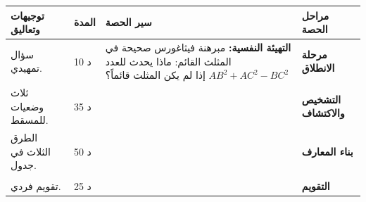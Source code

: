 \documentclass[12pt,a4paper]{article}
\newenvironment{LTR}{\begin{otherlanguage}{english}}{\end{otherlanguage}}
\newcommand{\ar}[1]{\foreignlanguage{arabic}{#1}}
\newcommand{\Phase}[1]{\textbf{#1}}
\newenvironment{Sayr}{%
\begin{LTR}\renewcommand{\arraystretch}{1.25}
\begin{longtable}{|p{0.17\textwidth}|>{\centering\arraybackslash}p{0.06\textwidth}|p{0.53\textwidth}|>{\centering\arraybackslash}p{0.12\textwidth}|}
\hline\rowcolor{cThm!12}\ar{\textbf{توجيهات وتعاليق}} & \ar{\textbf{المدة}} & \ar{\textbf{سير الحصة}} & \ar{\textbf{مراحل الحصة}}\\\hline\endhead
\hline\endfoot}{\end{longtable}\end{LTR}}
\newcommand{\Row}[4]{\ar{\small #4} & \ar{#3} & \ar{#2} & \cellcolor{cThm!8}\ar{\Phase{#1}}\\\hline}
\newcommand{\Lab}[2]{\foreignlanguage{english}{\tcbox[on line,colback=#1,colframe=#1,boxrule=0pt,arc=2pt,boxsep=1pt,left=5pt,right=5pt,top=1pt,bottom=1pt]{\ar{\textcolor{white}{\textbf{#2}}}}}}
\newcommand{\ck}{\ensuremath{{\color{cRem}\checkmark}}}
\begin{document}
\begin{Sayr}
\Row{مرحلة الانطلاق}{%
\textbf{التهيئة النفسية:} مبرهنة فيثاغورس صحيحة في المثلث القائم: ماذا يحدث للعدد $AB^2+AC^2-BC^2$ إذا لم يكن المثلث قائماً؟}{10 د}{سؤال تمهيدي.}
\Row{التشخيص والاكتشاف}{%
\Lab{cEx}{مناقشة نشاط 01 (أنشطة باب الجداء السلمي)}\par\ck\ $H$ المسقط العمودي لـ $C$ على $(AB)$: ثلاث وضعيات للنقطة $H$.\par
\ck\ نجد أن $\frac12(AB^2+AC^2-BC^2)$ يساوي $AB\times AH$ بإشارة حسب الوضعية: هذا العدد هو \textbf{الجداء السلمي} $\overrightarrow{AB}\cdot\overrightarrow{AC}$.\par
}{35 د}{ثلاث وضعيات للمسقط.}
\Row{بناء المعارف}{%
\Lab{cDef}{تعريف}\ $\vec u\cdot\vec v=\|\vec u\|\,\|\vec v\|\cos(\vec u;\vec v)$ (ويساوي $0$ إذا كان أحدهما معدوماً).\par\Lab{cThm}{طرق الحساب}\par\ck\ \textbf{بالإسقاط}: $\overrightarrow{AB}\cdot\overrightarrow{AC}=\overrightarrow{AB}\cdot\overrightarrow{AH}$ ($H$ مسقط $C$ على $(AB)$).\par
\ck\ \textbf{بالنظيمين}: $\vec u\cdot\vec v=\frac12\left(\|\vec u+\vec v\|^2-\|\vec u\|^2-\|\vec v\|^2\right)$.\par
\ck\ \textbf{بالمركبات} (معلم متعامد ومتجانس): $\vec u(x;y)$ ، $\vec v(x^{\prime};y^{\prime})$: $\vec u\cdot\vec v=xx^{\prime}+yy^{\prime}$.\par
\par\smallskip\begin{LTR}\centering \begin{tikzpicture}[scale=0.9,font=\scriptsize]
\coordinate (A) at (0,0); \coordinate (B) at (4,0); \coordinate (C) at (2.6,2); \coordinate (H) at (2.6,0);
\draw[thick,->,cDef] (A)--(B); \draw[thick,->,cThm] (A)--(C); \draw[dashed] (C)--(H);
\draw (2.6,0.25)--(2.35,0.25)--(2.35,0);
\fill (A) circle (1.4pt) node[below left]{$A$}; \fill (B) circle (1.4pt) node[below]{$B$};
\fill (C) circle (1.4pt) node[above]{$C$}; \fill (H) circle (1.4pt) node[below]{$H$};
\end{tikzpicture}\end{LTR}\par }{50 د}{الطرق الثلاث في جدول.}
\Row{}{%
\Lab{cEx}{مثال}\ $AB=4$ ، $AC=3$ ، $\widehat{BAC}=\frac\pi3$: $\overrightarrow{AB}\cdot\overrightarrow{AC}=4\times3\times\frac12=6$ ؛ $\vec u(2;-1)$ ، $\vec v(3;4)$: $\vec u\cdot\vec v=6-4=2$.\par\Lab{cThm!80!black}{حذار}\ الجداء السلمي \textbf{عدد} وليس شعاعاً.}{}{}
\Row{التقويم}{%
\Lab{cEx}{تطبيق}\par $ABC$ متقايس الأضلاع طول ضلعه $2$: احسب $\overrightarrow{AB}\cdot\overrightarrow{AC}$. ثم احسب $\vec u\cdot\vec v$ حيث $\vec u(1;2)$ و $\vec v(-4;2)$.\par\textbf{الحل:} $2\times2\times\cos\frac\pi3=2$ ؛ $-4+4=0$.\par\textbf{واجب منزلي:} تمارين 27 ، 29 ، 31 ، 33 ، 34 ، 50 ، 51 من باب الجداء السلمي.\par\smallskip\textbf{ملاحظات حول سير الحصة:} \dotfill}{25 د}{تقويم فردي.}
\end{Sayr}
\end{document}
